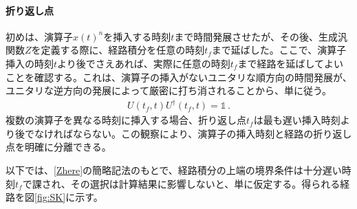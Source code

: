 \documentclass[a4paper,11pt,oneside]{article}
\theoremstyle{definition}
\numberwithin{equation}{section}
\begin{document}
\paragraph{折り返し点} 初めは、演算子$ \hat x(t)^{n}$を挿入する時刻$t $まで時間発展させたが、その後、生成汎関数$ Z$を定義する際に、経路積分を任意の時刻$t_{f} $まで延ばした。ここで、演算子挿入の時刻$t $より後でさえあれば、実際に任意の時刻$t_f $まで経路を延ばしてよいことを確認する。これは、演算子の挿入がないユニタリな順方向の時間発展が、ユニタリな逆方向の発展によって厳密に打ち消されることから、単に従う。
\begin{align}\label{tf}
 U(t_{f},t)U^{\dagger}(t_{f},t)=\mathds{1}\,.
\end{align}
複数の演算子を異なる時刻に挿入する場合、折り返し点$ t_{f} $は最も遅い挿入時刻より後でなければならない。この観察により、演算子の挿入時刻と経路の折り返し点を明確に分離できる。



以下では、\eqref{Zhere}の簡略記法のもとで、経路積分の上端の境界条件は十分遅い時刻$ t_{f}$で課され、その選択は計算結果に影響しないと、単に仮定する。得られる経路を図\ref{fig:SK}に示す。
\end{document}
